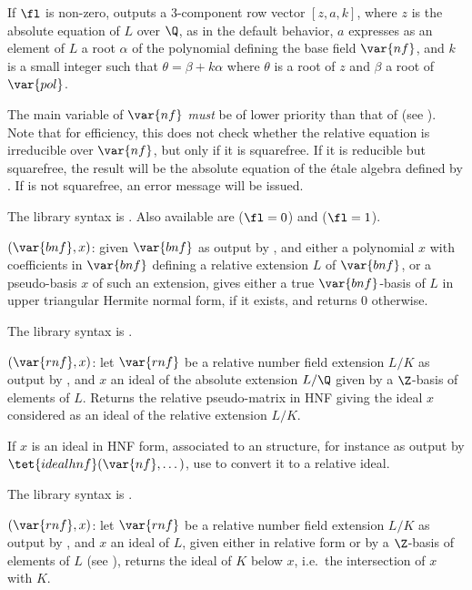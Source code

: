 If $\fl$ is non-zero, outputs a 3-component row vector $[z,a,k]$, where
$z$ is the absolute equation of $L$ over $\Q$, as in the default behavior,
$a$ expresses as an element of $L$ a root $\alpha$ of the polynomial
defining the base field $\var{nf}$, and $k$ is a small integer such that
$\theta = \beta+k\alpha$ where $\theta$ is a root of $z$ and $\beta$ a root
of $\var{pol}$.

The main variable of $\var{nf}$ \emph{must} be of lower priority than that
of  (see ). Note that for efficiency, this does
not check whether the relative equation is irreducible over $\var{nf}$, but
only if it is squarefree. If it is reducible but squarefree, the result will
be the absolute equation of the \'etale algebra defined by . If
 is not squarefree, an error message will be issued.

The library syntax is .
Also available are
 ($\fl = 0$) and
 ($\fl = 1$).

$(\var{bnf},x)$: \label{se:rnfhnfbasis}given $\var{bnf}$ as output by
, and either a polynomial $x$ with coefficients in $\var{bnf}$
defining a relative extension $L$ of $\var{bnf}$, or a pseudo-basis $x$ of
such an extension, gives either a true $\var{bnf}$-basis of $L$ in upper
triangular Hermite normal form, if it exists, and returns $0$ otherwise.

The library syntax is .

$(\var{rnf},x)$: \label{se:rnfidealabstorel}let $\var{rnf}$ be a relative
number field extension $L/K$ as output by , and $x$ an ideal of
the absolute extension $L/\Q$ given by a $\Z$-basis of elements of $L$.
Returns the relative pseudo-matrix in HNF giving the ideal $x$ considered as
an ideal of the relative extension $L/K$.

If $x$ is an ideal in HNF form, associated to an  structure, for
instance as output by $\tet{idealhnf}(\var{nf},\dots)$,
use  to convert it to a relative ideal.

The library syntax is .

$(\var{rnf},x)$: \label{se:rnfidealdown}let $\var{rnf}$ be a relative number
field extension $L/K$ as output by , and $x$ an ideal of
$L$, given either in relative form or by a $\Z$-basis of elements of $L$
(see ), returns the ideal of $K$ below $x$,
i.e.~the intersection of $x$ with $K$.


